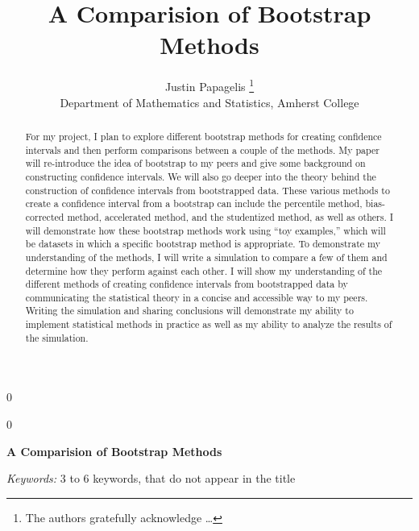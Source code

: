 \documentclass[12pt]{article}
\newcommand{\blind}{0}
\begin{document}
\def\spacingset#1{\renewcommand{\baselinestretch}%
{#1}\small\normalsize} \spacingset{1}



\blind
{
  \title{\bf A Comparision of Bootstrap Methods}

  \author{
        Justin Papagelis \thanks{The authors gratefully acknowledge
\ldots{}} \\
    Department of Mathematics and Statistics, Amherst College\\
      }
  \maketitle
} \fi

\blind
{
  \bigskip
  \bigskip
  \bigskip
  \begin{center}
    {\LARGE\bf A Comparision of Bootstrap Methods}
  \end{center}
  \medskip
} \fi

\bigskip
\begin{abstract}
For my project, I plan to explore different bootstrap methods for
creating confidence intervals and then perform comparisons between a
couple of the methods. My paper will re-introduce the idea of bootstrap
to my peers and give some background on constructing confidence
intervals. We will also go deeper into the theory behind the
construction of confidence intervals from bootstrapped data. These
various methods to create a confidence interval from a bootstrap can
include the percentile method, bias-corrected method, accelerated
method, and the studentized method, as well as others. I will
demonstrate how these bootstrap methods work using ``toy examples,''
which will be datasets in which a specific bootstrap method is
appropriate. To demonstrate my understanding of the methods, I will
write a simulation to compare a few of them and determine how they
perform against each other. I will show my understanding of the
different methods of creating confidence intervals from bootstrapped
data by communicating the statistical theory in a concise and accessible
way to my peers. Writing the simulation and sharing conclusions will
demonstrate my ability to implement statistical methods in practice as
well as my ability to analyze the results of the simulation.
\end{abstract}

\noindent%
{\it Keywords:} 3 to 6 keywords, that do not appear in the title
\vfill
\end{document}
